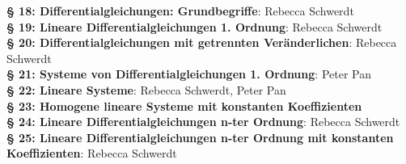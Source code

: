 \documentclass[a4paper,oneside,DIV15,BCOR12mm,chapterprefix=true,headings=onelinechapter]{scrbook}
\begin{document}
\textbf{§ 18: Differentialgleichungen: Grundbegriffe}: Rebecca Schwerdt\\
\textbf{§ 19: Lineare Differentialgleichungen 1. Ordnung}: Rebecca Schwerdt\\
\textbf{§ 20: Differentialgleichungen mit getrennten Veränderlichen}: Rebecca Schwerdt\\
\textbf{§ 21: Systeme von Differentialgleichungen 1. Ordnung}: Peter Pan\\
\textbf{§ 22: Lineare Systeme}: Rebecca Schwerdt, Peter Pan\\
\textbf{§ 23: Homogene lineare Systeme mit konstanten Koeffizienten}\\
\textbf{§ 24: Lineare Differentialgleichungen n-ter Ordnung}: Rebecca Schwerdt\\
\textbf{§ 25: Lineare Differentialgleichungen n-ter Ordnung mit konstanten Koeffizienten}: Rebecca Schwerdt\\
\end{document}
